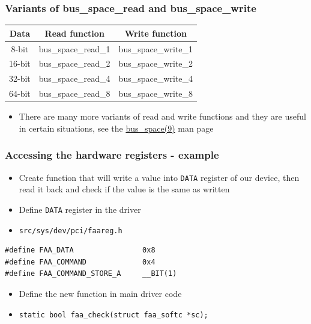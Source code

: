 \documentclass[dvipsnames,table]{beamer}
\begin{document}
\begin{frame}
\frametitle{Variants of bus\_space\_read and bus\_space\_write}
\begin{center}
\begin{tabular}{|c|c|c|}
\hline
Data & Read function & Write function \\
\hline
\hline
8-bit & bus\_space\_read\_1 & bus\_space\_write\_1 \\
\hline
16-bit & bus\_space\_read\_2 & bus\_space\_write\_2 \\
\hline
32-bit & bus\_space\_read\_4 & bus\_space\_write\_4 \\
\hline
64-bit & bus\_space\_read\_8 & bus\_space\_write\_8 \\
\hline
\end{tabular}
\end{center}
\begin{itemize}
	\item There are many more variants of read and write functions and they are useful in certain situations, see the \href{http://netbsd.gw.com/cgi-bin/man-cgi?bus_space++NetBSD-current}{bus\_space(9)} man page
\end{itemize}
\end{frame}

\begin{frame}[fragile]
\frametitle{Accessing the hardware registers - example}
\begin{itemize}
	\item Create function that will write a value into {\tt DATA} register of our device, then read it back and check if the value is the same as written
	\item Define {\tt DATA} register in the driver
	\item {\tt src/sys/dev/pci/faareg.h}
\end{itemize}
\begin{lstlisting}
#define FAA_DATA                0x8
#define FAA_COMMAND             0x4
#define FAA_COMMAND_STORE_A     __BIT(1)
\end{lstlisting}
\begin{itemize}
	\item Define the new function in main driver code
	\item {\tt static bool faa\_check(struct faa\_softc *sc);}
\end{itemize}
\end{frame}
\end{document}
